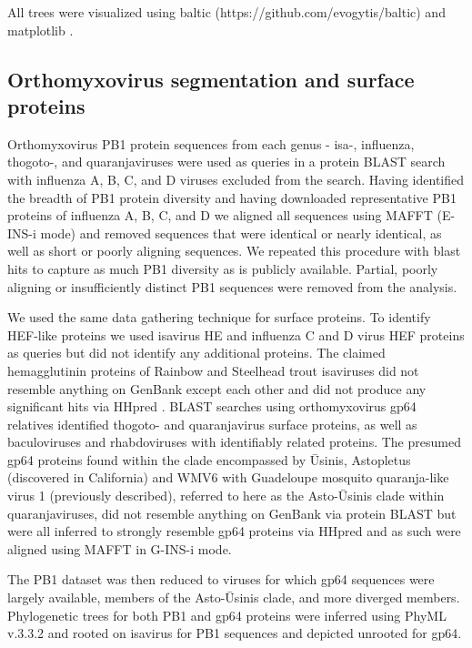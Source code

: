 \documentclass[11pt,twocolumn]{article}
\begin{document}
All trees were visualized using baltic (https://github.com/evogytis/baltic) and matplotlib \citep{hunter_matplotlib_2007}.


\subsection{Orthomyxovirus segmentation and surface proteins}

Orthomyxovirus PB1 protein sequences from each genus - isa-, influenza, thogoto-, and quaranjaviruses were used as queries in a protein BLAST \citep{altschul_basic_1990} search with influenza A, B, C, and D viruses excluded from the search.
Having identified the breadth of PB1 protein diversity and having downloaded representative PB1 proteins of influenza A, B, C, and D we aligned all sequences using MAFFT \citep{katoh_mafft_2005} (E-INS-i mode) and removed sequences that were identical or nearly identical, as well as short or poorly aligning sequences.
We repeated this procedure with blast hits to capture as much PB1 diversity as is publicly available.
Partial, poorly aligning or insufficiently distinct PB1 sequences were removed from the analysis.

We used the same data gathering technique for surface proteins.
To identify HEF-like proteins we used isavirus HE and influenza C and D virus HEF proteins as queries but did not identify any additional proteins.
The claimed hemagglutinin proteins of Rainbow and Steelhead trout isaviruses did not resemble anything on GenBank except each other and did not produce any significant hits via HHpred \citep{finn_hmmer_2011}.
BLAST searches using orthomyxovirus gp64 relatives identified thogoto- and quaranjavirus surface proteins, as well as baculoviruses and rhabdoviruses with identifiably related proteins.
The presumed gp64 proteins found within the clade encompassed by \={U}sinis, Astopletus (discovered in California) and WMV6 with Guadeloupe mosquito quaranja-like virus 1 (previously described), referred to here as the Asto-\={U}sinis clade within quaranjaviruses, did not resemble anything on GenBank via protein BLAST but were all inferred to strongly resemble gp64 proteins via HHpred and as such were aligned using MAFFT in G-INS-i mode.

The PB1 dataset was then reduced to viruses for which gp64 sequences were largely available, members of the Asto-\={U}sinis clade, and more diverged members.
Phylogenetic trees for both PB1 and gp64 proteins were inferred using PhyML v.3.3.2 and rooted on isavirus for PB1 sequences and depicted unrooted for gp64.
\end{document}
